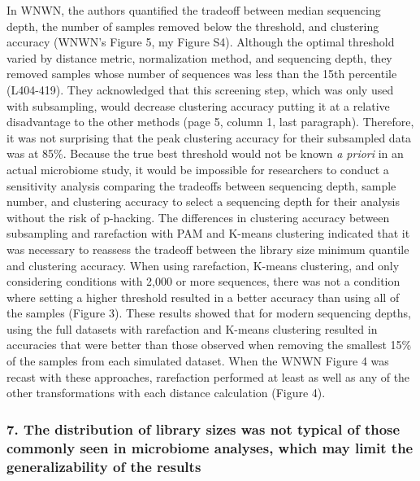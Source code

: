 \documentclass[
]{article}
\begin{document}
In WNWN, the authors quantified the tradeoff between median sequencing
depth, the number of samples removed below the threshold, and clustering
accuracy (WNWN's Figure 5, my Figure S4). Although the optimal threshold
varied by distance metric, normalization method, and sequencing depth,
they removed samples whose number of sequences was less than the 15th
percentile (L404-419). They acknowledged that this screening step, which
was only used with subsampling, would decrease clustering accuracy
putting it at a relative disadvantage to the other methods (page 5,
column 1, last paragraph). Therefore, it was not surprising that the
peak clustering accuracy for their subsampled data was at 85\%. Because
the true best threshold would not be known \emph{a priori} in an actual
microbiome study, it would be impossible for researchers to conduct a
sensitivity analysis comparing the tradeoffs between sequencing depth,
sample number, and clustering accuracy to select a sequencing depth for
their analysis without the risk of p-hacking. The differences in
clustering accuracy between subsampling and rarefaction with PAM and
K-means clustering indicated that it was necessary to reassess the
tradeoff between the library size minimum quantile and clustering
accuracy. When using rarefaction, K-means clustering, and only
considering conditions with 2,000 or more sequences, there was not a
condition where setting a higher threshold resulted in a better accuracy
than using all of the samples (Figure 3). These results showed that for
modern sequencing depths, using the full datasets with rarefaction and
K-means clustering resulted in accuracies that were better than those
observed when removing the smallest 15\% of the samples from each
simulated dataset. When the WNWN Figure 4 was recast with these
approaches, rarefaction performed at least as well as any of the other
transformations with each distance calculation (Figure 4).

\hypertarget{the-distribution-of-library-sizes-was-not-typical-of-those-commonly-seen-in-microbiome-analyses-which-may-limit-the-generalizability-of-the-results}{%
\subsubsection{7. The distribution of library sizes was not typical of
those commonly seen in microbiome analyses, which may limit the
generalizability of the
results}\label{the-distribution-of-library-sizes-was-not-typical-of-those-commonly-seen-in-microbiome-analyses-which-may-limit-the-generalizability-of-the-results}}
\end{document}
